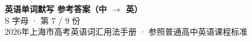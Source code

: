 \documentclass[10pt,a4paper]{article}
\begin{document}
\pagestyle{plain}

\begin{center}
{\LARGE\bfseries 英语单词默写 \quad 参考答案（中 $\to$ 英）}\\[0.22em]
{\large S 字母 · 第 7 / 9 份}\\[0.18em]
{\small 2026年上海市高考英语词汇用法手册 · 参照普通高中英语课程标准}
\end{center}

\vspace{0.2em}
\noindent{\color{rulegray}\rule{\textwidth}{0.8pt}}

\vspace{0.35em}

\vspace{0.25em}
\renewcommand{\arraystretch}{1.32}
\end{document}
